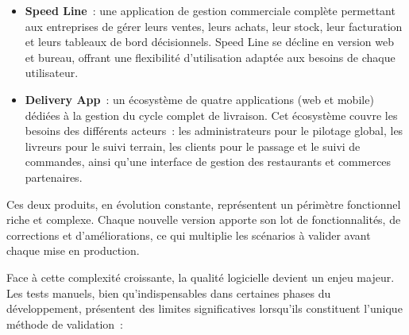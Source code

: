 \begin{itemize}
  \item \textbf{Speed Line}~: une application de gestion commerciale
    compl\`{e}te permettant aux entreprises de g\'{e}rer leurs ventes, leurs
    achats, leur stock, leur facturation et leurs tableaux de bord
    d\'{e}cisionnels. Speed Line se d\'{e}cline en version web et bureau, offrant
    une flexibilit\'{e} d'utilisation adapt\'{e}e aux besoins de chaque
    utilisateur.

  \item \textbf{Delivery App}~: un \'{e}cosyst\`{e}me de quatre applications
    (web et mobile) d\'{e}di\'{e}es \`{a} la gestion du cycle complet de livraison.
    Cet \'{e}cosyst\`{e}me couvre les besoins des diff\'{e}rents acteurs~: les
    administrateurs pour le pilotage global, les livreurs pour le suivi
    terrain, les clients pour le passage et le suivi de commandes, ainsi
    qu'une interface de gestion des restaurants et commerces partenaires.
\end{itemize}

Ces deux produits, en \'{e}volution constante, repr\'{e}sentent un p\'{e}rim\`{e}tre
fonctionnel riche et complexe. Chaque nouvelle version apporte son lot de
fonctionnalit\'{e}s, de corrections et d'am\'{e}liorations, ce qui multiplie les
sc\'{e}narios \`{a} valider avant chaque mise en production.

\vspace{0.3cm}


Face \`{a} cette complexit\'{e} croissante, la qualit\'{e} logicielle devient un
enjeu majeur. Les tests manuels, bien qu'indispensables dans certaines
phases du d\'{e}veloppement, pr\'{e}sentent des limites significatives lorsqu'ils
constituent l'unique m\'{e}thode de validation~:

